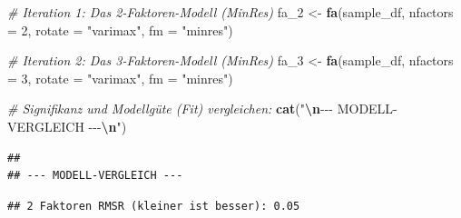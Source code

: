 \documentclass[
]{article}
\newenvironment{Shaded}{\begin{snugshade}}{\end{snugshade}}
\newcommand{\AttributeTok}[1]{\textcolor[rgb]{0.13,0.29,0.53}{#1}}
\newcommand{\CommentTok}[1]{\textcolor[rgb]{0.56,0.35,0.01}{\textit{#1}}}
\newcommand{\DecValTok}[1]{\textcolor[rgb]{0.00,0.00,0.81}{#1}}
\newcommand{\FunctionTok}[1]{\textcolor[rgb]{0.13,0.29,0.53}{\textbf{#1}}}
\newcommand{\NormalTok}[1]{#1}
\newcommand{\OtherTok}[1]{\textcolor[rgb]{0.56,0.35,0.01}{#1}}
\newcommand{\SpecialCharTok}[1]{\textcolor[rgb]{0.81,0.36,0.00}{\textbf{#1}}}
\newcommand{\StringTok}[1]{\textcolor[rgb]{0.31,0.60,0.02}{#1}}
\begin{document}
\begin{Shaded}
\begin{Highlighting}[]
\CommentTok{\# Iteration 1: Das 2{-}Faktoren{-}Modell (MinRes)}
\NormalTok{fa\_2 }\OtherTok{\textless{}{-}} \FunctionTok{fa}\NormalTok{(sample\_df, }\AttributeTok{nfactors =} \DecValTok{2}\NormalTok{, }\AttributeTok{rotate =} \StringTok{"varimax"}\NormalTok{, }\AttributeTok{fm =} \StringTok{"minres"}\NormalTok{)}

\CommentTok{\# Iteration 2: Das 3{-}Faktoren{-}Modell (MinRes)}
\NormalTok{fa\_3 }\OtherTok{\textless{}{-}} \FunctionTok{fa}\NormalTok{(sample\_df, }\AttributeTok{nfactors =} \DecValTok{3}\NormalTok{, }\AttributeTok{rotate =} \StringTok{"varimax"}\NormalTok{, }\AttributeTok{fm =} \StringTok{"minres"}\NormalTok{)}

\CommentTok{\# Signifikanz und Modellgüte (Fit) vergleichen:}
\FunctionTok{cat}\NormalTok{(}\StringTok{"}\SpecialCharTok{\textbackslash{}n}\StringTok{{-}{-}{-} MODELL{-}VERGLEICH {-}{-}{-}}\SpecialCharTok{\textbackslash{}n}\StringTok{"}\NormalTok{)}
\end{Highlighting}
\end{Shaded}

\begin{verbatim}
## 
## --- MODELL-VERGLEICH ---
\end{verbatim}

\begin{Shaded}
\end{Shaded}

\begin{verbatim}
## 2 Faktoren RMSR (kleiner ist besser): 0.05
\end{verbatim}

\begin{Shaded}
\end{Shaded}
\end{document}
